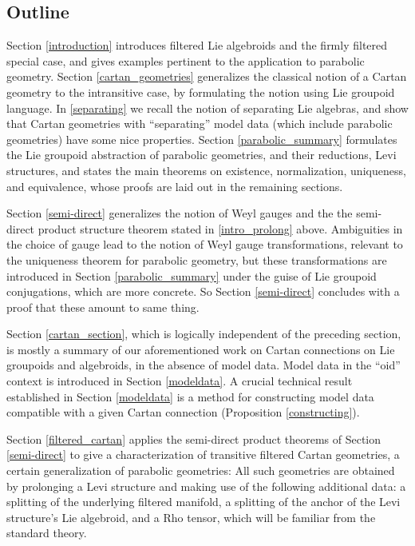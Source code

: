 \documentclass[leqno,12pt]{amsart} %
\begin{document}
\subsection{Outline}
Section \ref{introduction} introduces filtered Lie algebroids and the firmly filtered
special case, and gives examples pertinent to the application to parabolic
geometry. Section \ref{cartan_geometries} generalizes the classical notion of a Cartan
geometry to the intransitive case, by formulating the notion using Lie groupoid
language. In \ref{separating} we recall the notion of separating Lie algebras, and show
that Cartan geometries with ``separating'' model data (which include parabolic geometries)
have some nice properties. Section \ref{parabolic_summary} formulates the Lie groupoid
abstraction of parabolic geometries, and their reductions, Levi structures, and states the
main theorems on existence, normalization, uniqueness, and equivalence, whose proofs are
laid out in the remaining sections.

Section \ref{semi-direct} generalizes the notion of Weyl gauges and the the semi-direct
product structure theorem stated in \ref{intro_prolong} above. Ambiguities in the choice of
gauge lead to the notion of Weyl gauge transformations, relevant to the uniqueness
theorem for parabolic geometry, but these transformations are introduced in Section
\ref{parabolic_summary} under the guise of Lie groupoid conjugations, which are more
concrete. So Section \ref{semi-direct} concludes with a proof that these amount to same
thing.

Section \ref{cartan_section}, which is logically independent of the preceding section, is
mostly a summary of our aforementioned work on Cartan connections on Lie groupoids and
algebroids, in the absence of model data. Model data in the ``oid'' context is introduced
in Section \ref{modeldata}. A crucial technical result established in Section
\ref{modeldata} is a method for constructing model data compatible with a given Cartan
connection (Proposition \ref{constructing}).

Section \ref{filtered_cartan} applies the semi-direct product theorems of Section
\ref{semi-direct} to give a characterization of transitive filtered Cartan geometries, a
certain generalization of parabolic geometries: All such geometries are obtained by
prolonging a Levi structure and making use of the following additional data: a splitting
of the underlying filtered manifold, a splitting of the anchor of the Levi structure's Lie
algebroid, and a Rho tensor, which will be familiar from the standard theory.
\end{document}
